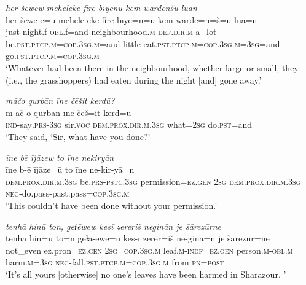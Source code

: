 \ea \label{PM.27}
\textit{her šewēw meheleke fire bīyenū kem wārdenšū lūān} \\ 
\gll her šewe-ē=ū mehele-eke fire bīye=n=ū kem wārde=n=š=ū lūā=n \\ 
 just night.f\textsc{-obl}.f=and neighbourhood\textsc{.m}\textsc{-def}\textsc{.dir}\textsc{.m} a\_lot be\textsc{.pst}\textsc{.ptcp}\textsc{.m}\textsc{=cop}\textsc{.3sg}\textsc{.m}=and little eat\textsc{.pst}\textsc{.ptcp}\textsc{.m}\textsc{=cop}\textsc{.3sg}\textsc{.m}\textsc{=3sg}=and go\textsc{.pst}\textsc{.ptcp}\textsc{.m}\textsc{=cop}\textsc{.3sg}\textsc{.m} \\ 
\glt `Whatever had been there in the neighbourhood, whether large or small, they (i.e., the grasshoppers) had eaten during the night [and] gone away.'
\z 
 
\ea \label{PM.29}
\textit{māčo qurbān īne čēšit kerdū?} \\ 
\gll m-āč-o qurbān īne čēš=it kerd=ū \\ 
 \textsc{ind-}say\textsc{.prs}\textsc{-3sg} sir.\textsc{voc} \textsc{dem.prox}\textsc{.dir}\textsc{.m}\textsc{.3sg} what\textsc{=\textsc{2sg}} do\textsc{.pst}=and \\ 
\glt `They said, ‘Sir, what have you done?'
\z 
 
\ea \label{PM.30}
\textit{īne bē ījāzew to īne nekiryān} \\ 
\gll īne b-ē ījāze=ū to īne ne-kir-yā=n \\ 
 \textsc{dem.prox}\textsc{.dir}\textsc{.m}\textsc{.3sg} be\textsc{.prs}\textsc{-pstc}\textsc{.3sg} permission\textsc{\textsc{=ez.gen}} \textsc{2sg} \textsc{dem.prox}\textsc{.dir}\textsc{.m}\textsc{.3sg} \textsc{neg-}do.pass-past.pass\textsc{=cop}\textsc{.3sg}\textsc{.m} \\ 
\glt `This couldn’t have been done without your permission.'
\z 
 
\ea \label{PM.31}
\textit{tenhā hinū ton, geɫēwew kesī zereriš neginān je šārezūrne} \\ 
\gll tenhā hin=ū to=n geɫā-ēwe=ū kes-ī zerer=iš ne-ginā=n je šārezūr=ne \\ 
 not\_even ez.pron\textsc{\textsc{=ez.gen}} \textsc{2sg}\textsc{=cop}\textsc{.3sg}\textsc{.m} leaf\textsc{.m}\textsc{-indf}\textsc{\textsc{=ez.gen}} person\textsc{.m}\textsc{-obl}\textsc{.m} harm\textsc{.m}\textsc{=3sg} \textsc{neg-}fall\textsc{.pst}\textsc{.ptcp}\textsc{.m}\textsc{=cop}\textsc{.3sg}\textsc{.m} from \textsc{pn}\textsc{=\textsc{post}} \\ 
\glt `It’s all yours [otherwise] no one’s leaves have been harmed in Sharazour. '
\z 
 
